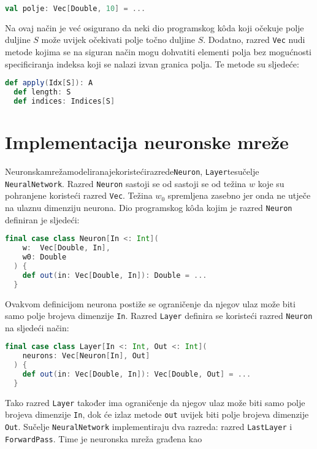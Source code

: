 \begin{lstlisting}[language=scala,label={lst:lstlisting3}]
  val polje: Vec[Double, 10] = ...
\end{lstlisting}
Na ovaj način je već osigurano da neki dio programskog kôda koji očekuje polje duljine $S$ može uvijek očekivati polje
točno duljine $S$. Dodatno, razred \texttt{Vec} nudi metode kojima se na siguran način mogu dohvatiti elementi polja
bez mogućnosti specificiranja indeksa koji se nalazi izvan granica polja. Te metode su sljedeće:
\begin{lstlisting}[language=scala,label={lst:lstlisting4}]
  def apply(Idx[S]): A
  def length: S
  def indices: Indices[S]
\end{lstlisting}

\section*{Implementacija neuronske mreže}
Neuronska\hfill{}mreža\hfill{}modelirana\hfill{}je\hfill{}koristeći\hfill{}razrede\hfill{}\texttt{Neuron},\hfill{}
\texttt{Layer}\hfill{}te\hfill{}sučelje\\
\texttt{NeuralNetwork}. Razred \texttt{Neuron} sastoji se od sastoji se od težina $w$ koje su pohranjene koristeći
razred \texttt{Vec}. Težina $w_0$ spremljena zasebno jer onda ne utječe na ulaznu dimenziju neurona. Dio programskog
kôda kojim je razred \texttt{Neuron} definiran je sljedeći:
\begin{lstlisting}[language=scala,label={lst:lstlisting5}]
  final case class Neuron[In <: Int](
    w:  Vec[Double, In],
    w0: Double
  ) {
    def out(in: Vec[Double, In]): Double = ...
  }
\end{lstlisting}
Ovakvom definicijom neurona postiže se ograničenje da njegov ulaz može biti samo polje brojeva dimenzije \texttt{In}.
Razred \texttt{Layer} definira se koristeći razred \texttt{Neuron} na sljedeći način:
\begin{lstlisting}[language=scala,label={lst:lstlisting6}]
  final case class Layer[In <: Int, Out <: Int](
    neurons: Vec[Neuron[In], Out]
  ) {
    def out(in: Vec[Double, In]): Vec[Double, Out] = ...
  }
\end{lstlisting}
Tako razred \texttt{Layer} također ima ograničenje da njegov ulaz može biti samo polje brojeva dimenzije \texttt{In},
dok će izlaz metode \texttt{out} uvijek biti polje brojeva dimenzije \texttt{Out}. Sučelje \texttt{NeuralNetwork}
implementiraju dva razreda: razred \texttt{LastLayer} i \texttt{ForwardPass}. Time je neuronska mreža građena kao
